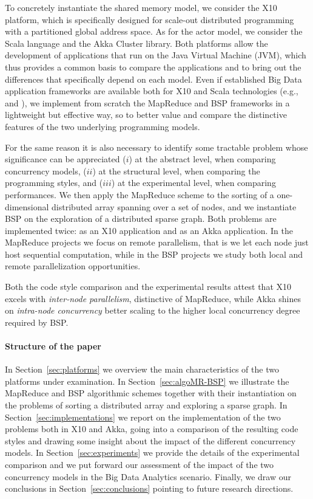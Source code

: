 \documentclass[a4paper]{article}
\numberwithin{equation}{section}
\begin{document}
To concretely instantiate the shared memory model, we consider the X10
platform, which is specifically designed for scale-out distributed
programming with a partitioned global address space.
As for the actor model, we consider the Scala language and the Akka
Cluster library. Both platforms allow the development of applications
that run on the Java Virtual Machine (JVM), which thus provides a 
common basis to compare the applications and to bring out
the differences that specifically depend on each model. 
Even if established Big Data application frameworks are available both
for X10 and Scala technologies (e.g., \cite{M3R-X10} and
\cite{Zaharia:2010:SCC:1863103.1863113}),  
we implement from scratch the MapReduce and BSP frameworks in a
lightweight but effective way, so to better value and compare the
distinctive features of the two underlying programming models. 

For the same reason it is also necessary to identify some tractable
problem whose significance can be appreciated 
($i$) at the abstract level, when comparing concurrency models,
($ii$) at the structural level, when comparing the programming styles,
and ($iii$) at the experimental level, when comparing performances. We
then apply the MapReduce scheme to the sorting of a one-dimensional
distributed array spanning over a set of nodes, and we instantiate BSP
on the exploration of a distributed sparse graph. Both problems are
implemented twice: as an X10 application and as an Akka application.
In the MapReduce projects we focus on remote parallelism, that is we
let each node just host sequential computation, while in the BSP
projects we study both local and remote parallelization
opportunities. 

Both the code style comparison and the experimental results
attest that X10 excels with \emph{inter-node parallelism}, distinctive
of MapReduce, while Akka shines on \emph{intra-node concurrency}
better scaling to the higher local concurrency degree required by BSP.


\paragraph{Structure of the paper}
In Section~\ref{sec:platforms} we overview the main characteristics
of the two platforms under examination. 
In Section~\ref{sec:algoMR-BSP} we illustrate the MapReduce and BSP
algorithmic schemes together with their instantiation on the problems
of sorting a distributed array and exploring a sparse graph. 
In Section~\ref{sec:implementations} we report on the implementation
of the two problems both in X10 and Akka, going into a comparison of
the resulting code styles and drawing some insight about the impact of
the different concurrency models. In Section~\ref{sec:experiments} we
provide the details of the experimental comparison and we put forward
our assessment of the impact of the two concurrency models in the Big
Data Analytics scenario. Finally, we draw our conclusions in
Section~\ref{sec:conclusions} pointing to future research directions.
\end{document}

